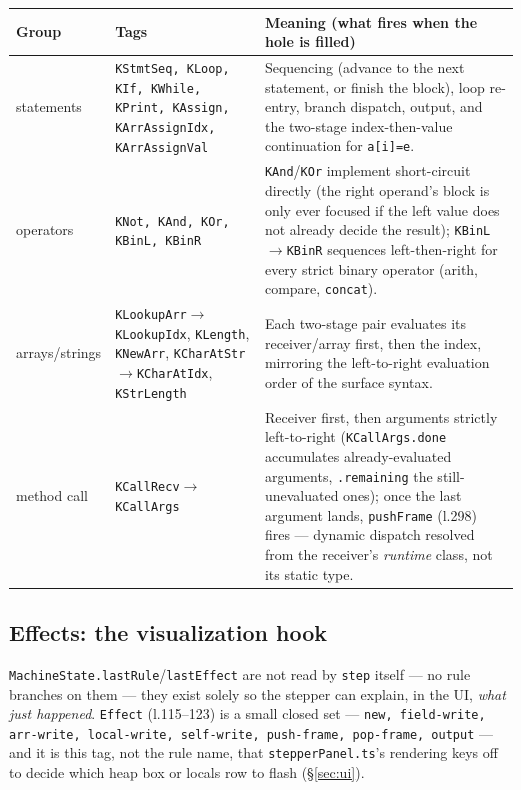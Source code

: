 \documentclass[11pt]{article}
\begin{document}
\begin{center}
\begin{longtable}{@{}p{3.6cm}p{3.4cm}p{7.2cm}@{}}
\toprule
\textbf{Group} & \textbf{Tags} & \textbf{Meaning (what fires when the hole is filled)} \\
\midrule
\endhead
statements &
  \texttt{KStmtSeq, KLoop, KIf, KWhile, KPrint, KAssign, KArrAssignIdx,
  KArrAssignVal} &
  Sequencing (advance to the next statement, or finish the block),
  loop re-entry, branch dispatch, output, and the two-stage
  index-then-value continuation for \texttt{a[i]=e}. \\
operators &
  \texttt{KNot, KAnd, KOr, KBinL, KBinR} &
  \texttt{KAnd}/\texttt{KOr} implement short-circuit directly (the
  right operand's block is only ever focused if the left value does not
  already decide the result); \texttt{KBinL}$\to$\texttt{KBinR} sequences
  left-then-right for every strict binary operator (arith, compare,
  \texttt{concat}). \\
arrays/strings &
  \texttt{KLookupArr}$\to$\linebreak\texttt{KLookupIdx}, \texttt{KLength},
  \texttt{KNewArr}, \texttt{KCharAtStr}$\to$\linebreak\texttt{KCharAtIdx},
  \texttt{KStrLength} &
  Each two-stage pair evaluates its receiver/array first, then the index,
  mirroring the left-to-right evaluation order of the surface syntax. \\
method call &
  \texttt{KCallRecv}$\to$\linebreak\texttt{KCallArgs} &
  Receiver first, then arguments strictly left-to-right
  (\texttt{KCallArgs.done} accumulates already-evaluated arguments,
  \texttt{.remaining} the still-unevaluated ones); once the last argument
  lands, \texttt{pushFrame} (l.298) fires --- dynamic dispatch resolved
  from the receiver's \emph{runtime} class, not its static type. \\
\bottomrule
\end{longtable}
\end{center}

\subsection{Effects: the visualization hook}

\texttt{MachineState.lastRule}/\texttt{lastEffect} are not read by
\texttt{step} itself --- no rule branches on them --- they exist solely so
the stepper can explain, in the UI, \emph{what just happened}.
\texttt{Effect} (l.115--123) is a small closed set --- \texttt{new,
field-write, arr-write, local-write, self-write, push-frame, pop-frame,
output} --- and it is this tag, not the rule name, that
\texttt{stepperPanel.ts}'s rendering keys off to decide which heap box or
locals row to flash (\S\ref{sec:ui}).
\end{document}
